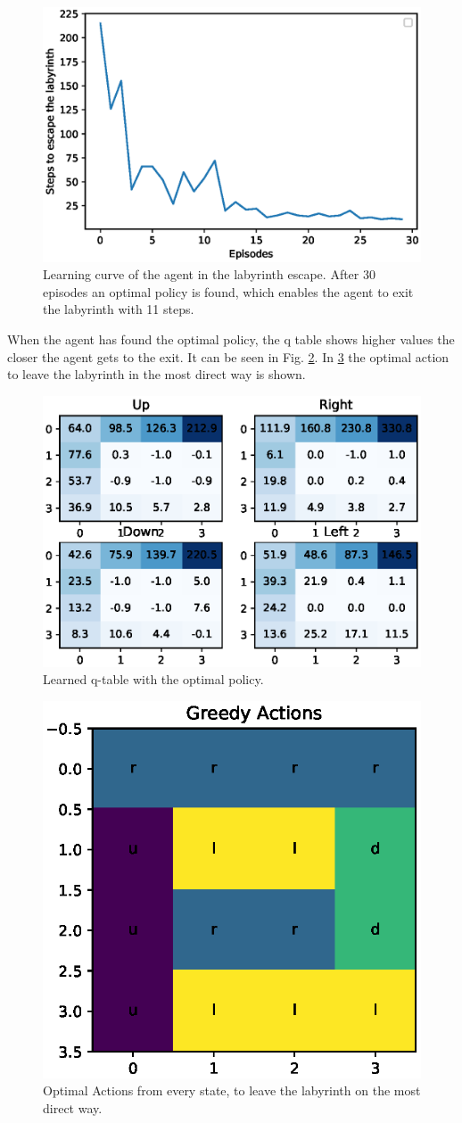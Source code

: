 \documentclass[paper=a4, fontsize=11pt]{scrartcl} %
\numberwithin{equation}{section} %
\numberwithin{figure}{section} %
\numberwithin{table}{section} %
\begin{document}
\begin{figure}[H]
\centering
\includegraphics[width=0.6\linewidth]{Images/learning_curve.eps}
\caption{Learning curve of the agent in the labyrinth escape. After 30 episodes an optimal policy is found, which enables the agent to exit the labyrinth with 11 steps.}
\label{fig:LabLearning}
\end{figure}

When the agent has found the optimal policy, the q table shows higher values the closer the agent gets to the exit. It can be seen in Fig. \ref{fig:LearnedQTables}. In \ref{fig:OptimalAction} the optimal action to leave the labyrinth in the most direct way is shown.

\begin{figure}[H]
\centering
\includegraphics[width=0.7\linewidth]{Images/direction_values.eps}
\caption{Learned q-table with the optimal policy.}
\label{fig:LearnedQTables}
\end{figure}

\begin{figure}[H]
\centering
\includegraphics[width=0.6\linewidth]{Images/greedy_directions.eps}
\caption{Optimal Actions from every state, to leave the labyrinth on the most direct way.}
\label{fig:OptimalAction}
\end{figure}
\end{document}
